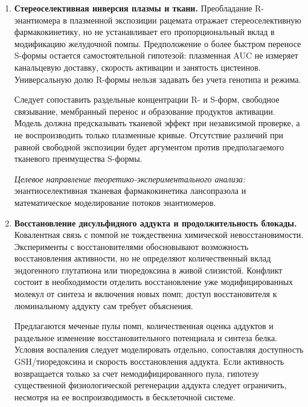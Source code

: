 \documentclass[11pt,a4paper,notitlepage]{report}
\newcommand{\src}[1]{\unskip\space\cite{#1}}
\begin{document}
\begin{enumerate}[label=\textbf{\arabic*.},leftmargin=*,itemsep=0.9\baselineskip]
\textit{Целевое направление теоретико-экспериментального анализа:} молекулярные механизмы внетаргетной аккумуляции лансопразола в лизосомальных компартментах клеток иммунной системы человека.

\item \textbf{Стереоселективная инверсия плазмы и ткани.} Преобладание R-энантиомера в плазменной экспозиции рацемата отражает стереоселективную фармакокинетику, но не устанавливает его пропорциональный вклад в модификацию желудочной помпы. Предположение о более быстром переносе S-формы остается самостоятельной гипотезой: плазменная AUC не измеряет канальцевую доставку, скорость активации и занятость цистеинов. Универсальную долю R-формы нельзя задавать без учета генотипа и режима.\src{futurestereo1996,molstereokin,molhumanstereo}

Следует сопоставить раздельные концентрации R- и S-форм, свободное связывание, мембранный перенос и образование продуктов активации. Модель должна предсказывать тканевой эффект при независимой проверке, а не воспроизводить только плазменные кривые. Отсутствие различий при равной свободной экспозиции будет аргументом против предполагаемого тканевого преимущества S-формы.

\textit{Целевое направление теоретико-экспериментального анализа:} энантиоселективная тканевая фармакокинетика лансопразола и математическое моделирование потоков энантиомеров.

\item \textbf{Восстановление дисульфидного аддукта и продолжительность блокады.} Ковалентная связь с помпой не тождественна химической невосстановимости. Эксперименты с восстановителями обосновывают возможность восстановления активности, но не определяют количественный вклад эндогенного глутатиона или тиоредоксина в живой слизистой. Конфликт состоит в необходимости отделить восстановление уже модифицированных молекул от синтеза и включения новых помп; доступ восстановителя к люминальному аддукту сам требует объяснения.\src{molcys,molrestore}

Предлагаются меченые пулы помп, количественная оценка аддуктов и раздельное изменение восстановительного потенциала и синтеза белка. Условия воспаления следует моделировать отдельно, сопоставляя доступность GSH/тиоредоксина и скорость восстановления аддукта. Если активность возвращается только за счет немодифицированного пула, гипотезу существенной физиологической регенерации аддукта следует ограничить, несмотря на ее воспроизводимость в бесклеточной системе.


\end{enumerate}
\end{document}

